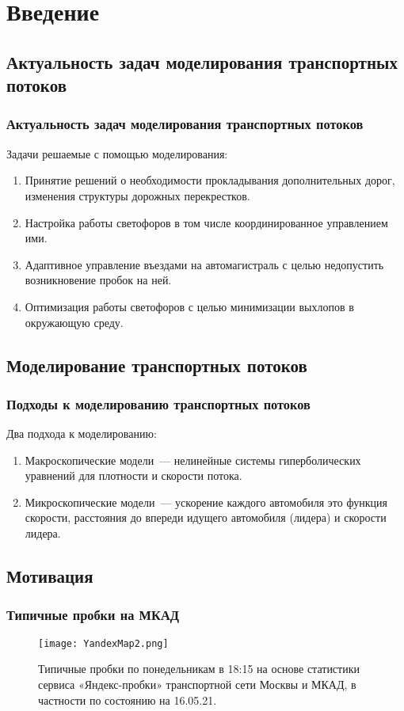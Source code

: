 \section{Введение}
\subsection{Актуальность задач моделирования транспортных потоков}
\begin{frame}
    \frametitle{Актуальность задач моделирования транспортных потоков}
    Задачи решаемые с помощью моделирования:
    \begin{enumerate}
      \item Принятие решений о необходимости прокладывания дополнительных дорог, изменения структуры дорожных перекрестков.
      \item Настройка работы светофоров в том числе координированное управлением ими.
      \item Адаптивное управление въездами на автомагистраль с целью недопустить возникновение пробок на ней.
      \item Оптимизация работы светофоров с целью минимизации выхлопов в окружающую среду.
    \end{enumerate}
\end{frame}


\subsection{Моделирование транспортных потоков}
\begin{frame}
    \frametitle{Подходы к моделированию транспортных потоков}
    Два подхода к моделированию:
    \begin{enumerate}
      \item Макроскопические модели~--- нелинейные системы гиперболических уравнений для плотности и скорости потока.
      \item Микроскопические модели~--- ускорение каждого автомобиля это функция скорости, расстояния до впереди идущего автомобиля (лидера) и скорости лидера.
    \end{enumerate}
\end{frame}


\subsection{Мотивация}
\begin{frame}
    \frametitle{Типичные пробки на МКАД}
    \begin{figure}[h]
        \centering
        \texttt{[image: YandexMap2.png]}
        \caption{Типичные пробки по понедельникам в 18:15 на основе статистики сервиса «Яндекс-пробки» транспортной сети Москвы и МКАД, в частности по состоянию на 16.05.21.}
    \end{figure}
\end{frame}

